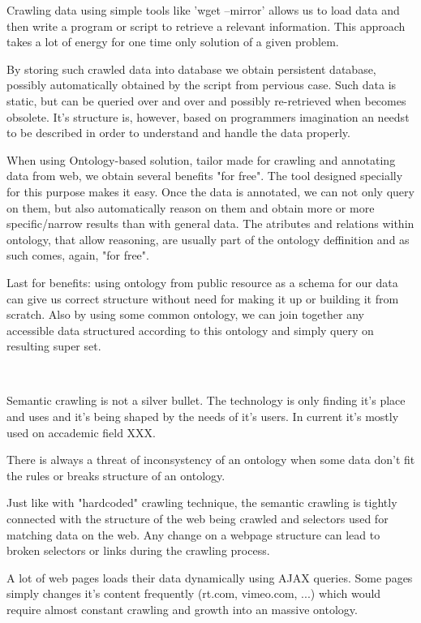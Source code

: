 Crawling data using simple tools like 'wget --mirror' allows us to load data
and then write a program or script to retrieve a relevant information. This
approach takes a lot of energy for one time only solution of a given problem. 

By storing such crawled data into database we obtain persistent database,
possibly automatically obtained by the script from pervious case. Such data is
static, but can be queried over and over and possibly re-retrieved when becomes
obsolete. It's structure is, however, based on programmers imagination an
needst to be described in order to understand and handle the data properly. 

When using Ontology-based solution, tailor made for crawling and annotating
data from web, we obtain several benefits "for free". The tool designed
specially for this purpose makes it easy. Once the data is annotated, we can
not only query on them, but also automatically reason on them and obtain more
or more specific/narrow results than with general data. The atributes and
relations within ontology, that allow reasoning, are usually part of the
ontology deffinition and as such comes, again, "for free". 

Last for benefits: using ontology from public resource as a schema for our data
can give us correct structure without need for making it up or building it from
scratch. Also by using some common ontology, we can join together any
accessible data structured according to this ontology and simply query on
resulting super set. 

~

Semantic crawling is not a silver bullet. The technology is only finding it's
place and uses and it's being shaped by the needs of it's users. In current
it's mostly used on accademic field XXX. 

There is always a threat of inconsystency of an ontology when some data don't
fit the rules or breaks structure of an ontology. 

Just like with "hardcoded" crawling technique, the semantic crawling is tightly
connected with the structure of the web being crawled and selectors used for
matching data on the web. Any change on a webpage structure can lead to broken
selectors or links during the crawling process. 

A lot of web pages loads their data dynamically using AJAX queries. Some pages
simply changes it's content frequently (rt.com, vimeo.com, ...) which would
require almost constant crawling and growth into an massive ontology. 

